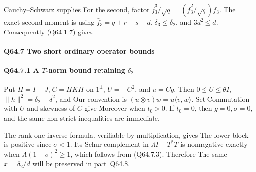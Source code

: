 Cauchy--Schwarz supplies
For the second, factor \(\bar f_3^3/\sqrt q=(\bar f_3^2/\sqrt q)\bar f_3\).
The exact second moment is
using \(\bar f_3=q+r-s-d\), \(\delta_3\le \delta_2\), and \(3d^2\le d\).
Consequently (Q64.1.7) gives

\paragraph{Q64.7 Two short ordinary operator bounds}

\paragraph{Q64.7.1 A \(T\)-norm bound retaining \(\delta_2\)}

Put \(\Pi=I-J\), \(C=\Pi K\Pi\) on \(1^\perp\),
\(U=-C^2\), and \(h=Cg\). Then
\(0\le U\le\theta I\), \(\|h\|^2=\delta_2-d^2\), and
Our convention is \((u\otimes v)w=u\langle v,\allowbreak  w\rangle\).
Set
Commutation with \(U\) and skewness of \(C\) give
Moreover
when \(t_0>0\). If \(t_0=0\), then \(g=0,\allowbreak  \sigma=0\), and the
same non-strict inequalities are immediate.

The rank-one inverse formula, verifiable by multiplication, gives
The lower block is positive since \(\sigma<1\).
Its Schur complement in \(\Lambda I-T^*T\) is nonnegative exactly
when \(\Lambda(1-\sigma)^2\ge1\), which follows from (Q64.7.3).
Therefore
The same \(x=\delta_2/d\) will be preserved in \mbox{\hyperref[part:Q64.8]{part Q64.8}}.



